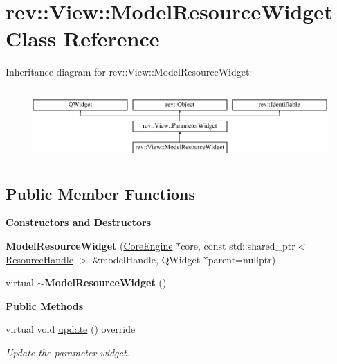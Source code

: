 \hypertarget{classrev_1_1_view_1_1_model_resource_widget}{}\section{rev\+::View\+::Model\+Resource\+Widget Class Reference}
\label{classrev_1_1_view_1_1_model_resource_widget}
Inheritance diagram for rev\+::View\+::Model\+Resource\+Widget\+:\begin{figure}[H]
\begin{center}
\leavevmode
\includegraphics[height=2.718446cm]{classrev_1_1_view_1_1_model_resource_widget}
\end{center}
\end{figure}
\subsection*{Public Member Functions}
\begin{Indent}\textbf{ Constructors and Destructors}\par
\begin{DoxyCompactItemize}
\item 
\mbox{\label{classrev_1_1_view_1_1_model_resource_widget_a42952e916f2d33c63b5db8c9874cec68}} 
{\bfseries Model\+Resource\+Widget} (\mbox{\hyperlink{classrev_1_1_core_engine}{Core\+Engine}} $\ast$core, const std\+::shared\+\_\+ptr$<$ \mbox{\hyperlink{classrev_1_1_resource_handle}{Resource\+Handle}} $>$ \&model\+Handle, Q\+Widget $\ast$parent=nullptr)
\item 
\mbox{\label{classrev_1_1_view_1_1_model_resource_widget_a18d87c147db263a532b2d5628d9a9e5d}} 
virtual {\bfseries $\sim$\+Model\+Resource\+Widget} ()
\end{DoxyCompactItemize}
\end{Indent}
\begin{Indent}\textbf{ Public Methods}\par
\begin{DoxyCompactItemize}
\item 
\mbox{\label{classrev_1_1_view_1_1_model_resource_widget_a1de272cca2c2b11d597a8957941e82d0}} 
virtual void \mbox{\hyperlink{classrev_1_1_view_1_1_model_resource_widget_a1de272cca2c2b11d597a8957941e82d0}{update}} () override
\begin{DoxyCompactList}\small\item\em Update the parameter widget. \end{DoxyCompactList}\end{DoxyCompactItemize}
\end{Indent}
